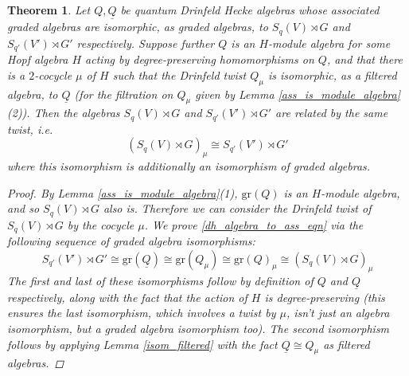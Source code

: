 \documentclass[10pt]{article}
\newcommand{\bb}{\medbreak}
\newcommand{\gr}{\text{gr}}
\newtheorem{theorem}[lemma]{Theorem}
\theoremstyle{definition}
\begin{document}
\begin{theorem}\label{dh_algebra_to_ass} Let $Q,\underline{Q}$ be quantum Drinfeld Hecke algebras whose associated graded algebras are isomorphic, as graded algebras, to $S_q(V)\rtimes G$ and $S_{q'}(V')\rtimes G'$ respectively. Suppose further $Q$ is an $H$-module algebra for some Hopf algebra $H$ acting by degree-preserving homomorphisms on $Q$, and that there is a $2$-cocycle $\mu$ of $H$ such that the Drinfeld twist $Q_\mu$ is isomorphic, as a filtered algebra, to $\underline{Q}$ (for the filtration on $Q_\mu$ given by Lemma \ref{ass_is_module_algebra} (2)). Then the algebras $S_q(V)\rtimes G$ and $S_{q'}(V')\rtimes G'$ are related by the same twist, i.e.
\begin{equation}\label{dh_algebra_to_ass_eqn}(S_q(V)\rtimes G)_\mu\cong S_{q'}(V')\rtimes G'\end{equation}
where this isomorphism is additionally an isomorphism of graded algebras.
\begin{proof}
By Lemma \ref{ass_is_module_algebra}(1), $\gr(Q)$ is an $H$-module algebra, and so $S_q(V)\rtimes G$ also is. Therefore we can consider the Drinfeld twist of $S_q(V)\rtimes G$ by the cocycle $\mu$. We prove \eqref{dh_algebra_to_ass_eqn} via the following sequence of graded algebra isomorphisms:
\begin{equation}\label{chain_isoms}
  S_{q'}(V')\rtimes G'\cong \gr(\underline{Q})\cong \gr(Q_\mu)\cong \gr(Q)_\mu\cong (S_q(V)\rtimes G)_\mu
\end{equation}
The first and last of these isomorphisms follow by definition of $Q$ and $\underline{Q}$ respectively, along with the fact that the action of $H$ is degree-preserving (this ensures the last isomorphism, which involves a twist by $\mu$, isn't just an algebra isomorphism, but a graded algebra isomorphism too). The second isomorphism follows by applying Lemma \ref{isom_filtered} with the fact $\underline{Q}\cong Q_\mu$ as filtered algebras.\bb


\end{proof}
\end{theorem}
\end{document}
